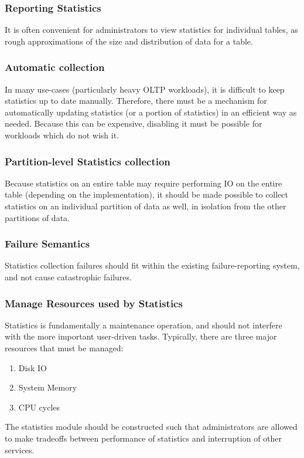 \subsubsection{Reporting Statistics}
It is often convenient for administrators to view statistics for individual tables, as rough approximations of the size and distribution of data for a table.

\subsubsection{Automatic collection}
In many use-cases (particularly heavy OLTP workloads), it is difficult to keep statistics up to date manually. Therefore, there must be a mechanism for automatically updating statistics (or a portion of statistics) in an efficient way as needed. Because this can be expensive, disabling it must be possible for workloads which do not wish it.

\subsubsection{Partition-level Statistics collection}
Because statistics on an entire table may require performing IO on the entire table (depending on the implementation), it should be made possible to collect statistics on an individual partition of data as well, in isolation from the other partitions of data.

\subsubsection{Failure Semantics}
Statistics collection failures should fit within the existing failure-reporting system, and not cause catastrophic failures.

\subsubsection{Manage Resources used by Statistics}
Statistics is fundamentally a maintenance operation, and should not interfere with the more important user-driven tasks. Typically, there are three major resources that must be managed:

\begin{enumerate}
\item Disk IO
\item System Memory
\item CPU cycles
\end{enumerate}

The statistics module should be constructed such that administrators are allowed to make tradeoffs between performance of statistics and interruption of other services.

